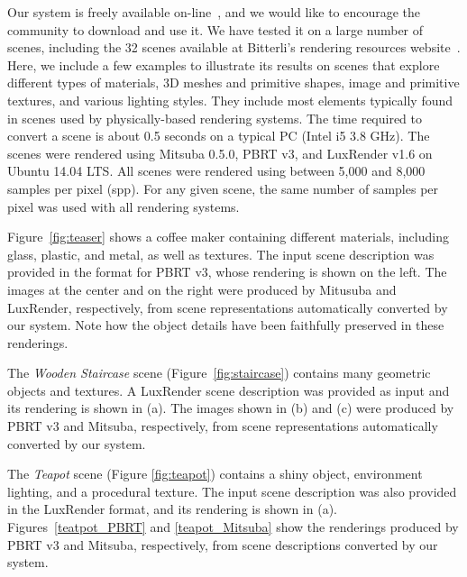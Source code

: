 Our system is freely available on-line~\cite{sceneConverter}, and we would like to encourage the community to download and use it.
We have tested it on a large number of scenes, including the 32 scenes available
at Bitterli's rendering resources website~\cite{resources16}. 
Here, we include a few examples to illustrate its results on scenes that explore different 
types of materials, 3D meshes and primitive shapes, image and 
primitive textures, and various lighting styles. They include most elements typically found in scenes used by physically-based rendering systems.  The time required to convert a scene is about 0.5 seconds on a typical PC (Intel i5 3.8 GHz).
% 
%
The scenes were rendered using Mitsuba 0.5.0, PBRT v3, and LuxRender v1.6 on 
Ubuntu 14.04 LTS. All scenes were rendered using between 5,000 and 8,000 samples per pixel (spp). For any given scene,
the same number of samples per pixel was used with all rendering systems. 

Figure~\ref{fig:teaser} shows a coffee maker containing different materials, including glass, plastic, and metal, as well as textures. The input scene description was provided in the format for PBRT v3, whose rendering is shown on the left. The images at the center and on the right were produced by Mitusuba and LuxRender, respectively, from scene representations automatically converted by our system. 
Note how the object details have been faithfully preserved in these renderings.

The \textit{Wooden Staircase} scene (Figure~\ref{fig:staircase}) contains many geometric objects and textures. 
A LuxRender scene description was provided as input and its rendering is shown in (a). The images shown in (b) and (c) were produced 
by PBRT v3 and Mitsuba, respectively, from scene representations automatically converted by our system. 

The \textit{Teapot} scene (Figure \ref{fig:teapot}) contains a shiny object, environment lighting, and a procedural texture. The input scene description was also provided in the LuxRender format, and its rendering is shown in (a). Figures~\ref{teatpot_PBRT} and \ref{teapot_Mitsuba} show the renderings produced by PBRT v3 and Mitsuba, respectively, from scene descriptions converted by our system.

